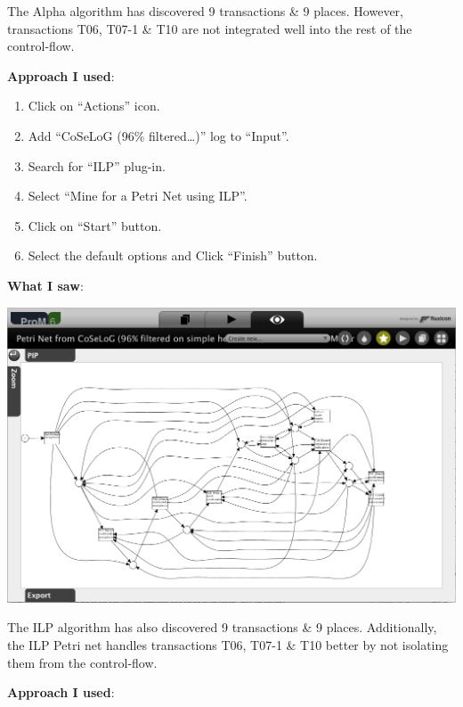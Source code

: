 \documentclass[]{article}
\begin{document}
The Alpha algorithm has discovered 9 transactions \& 9 places. However,
transactions T06, T07-1 \& T10 are not integrated well into the rest of
the control-flow.

\textbf{Approach I used}:

\begin{enumerate}
\def\labelenumi{\arabic{enumi}.}
\setcounter{enumi}{22}
\itemsep1pt\parskip0pt
\item
  Click on ``Actions'' icon.\\
\item
  Add ``CoSeLoG (96\% filtered\ldots{})'' log to ``Input''.\\
\item
  Search for ``ILP'' plug-in.\\
\item
  Select ``Mine for a Petri Net using ILP''.
\item
  Click on ``Start'' button.
\item
  Select the default options and Click ``Finish'' button.
\end{enumerate}

\textbf{What I saw}:

\includegraphics{CoSeLoG_Step_05_Filter96_PetriNet_ILP.png}

The ILP algorithm has also discovered 9 transactions \& 9 places.
Additionally, the ILP Petri net handles transactions T06, T07-1 \& T10
better by not isolating them from the control-flow.

\textbf{Approach I used}:
\end{document}

